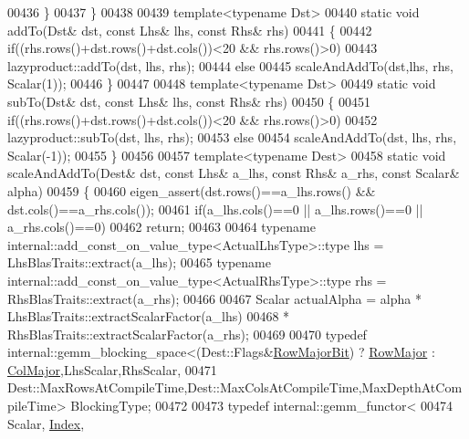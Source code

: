\begin{DoxyCode}
00436     \}
00437   \}
00438 
00439   \textcolor{keyword}{template}<\textcolor{keyword}{typename} Dst>
00440   \textcolor{keyword}{static} \textcolor{keywordtype}{void} addTo(Dst& dst, \textcolor{keyword}{const} Lhs& lhs, \textcolor{keyword}{const} Rhs& rhs)
00441   \{
00442     \textcolor{keywordflow}{if}((rhs.rows()+dst.rows()+dst.cols())<20 && rhs.rows()>0)
00443       lazyproduct::addTo(dst, lhs, rhs);
00444     \textcolor{keywordflow}{else}
00445       scaleAndAddTo(dst,lhs, rhs, Scalar(1));
00446   \}
00447 
00448   \textcolor{keyword}{template}<\textcolor{keyword}{typename} Dst>
00449   \textcolor{keyword}{static} \textcolor{keywordtype}{void} subTo(Dst& dst, \textcolor{keyword}{const} Lhs& lhs, \textcolor{keyword}{const} Rhs& rhs)
00450   \{
00451     \textcolor{keywordflow}{if}((rhs.rows()+dst.rows()+dst.cols())<20 && rhs.rows()>0)
00452       lazyproduct::subTo(dst, lhs, rhs);
00453     \textcolor{keywordflow}{else}
00454       scaleAndAddTo(dst, lhs, rhs, Scalar(-1));
00455   \}
00456 
00457   \textcolor{keyword}{template}<\textcolor{keyword}{typename} Dest>
00458   \textcolor{keyword}{static} \textcolor{keywordtype}{void} scaleAndAddTo(Dest& dst, \textcolor{keyword}{const} Lhs& a\_lhs, \textcolor{keyword}{const} Rhs& a\_rhs, \textcolor{keyword}{const} Scalar& alpha)
00459   \{
00460     eigen\_assert(dst.rows()==a\_lhs.rows() && dst.cols()==a\_rhs.cols());
00461     \textcolor{keywordflow}{if}(a\_lhs.cols()==0 || a\_lhs.rows()==0 || a\_rhs.cols()==0)
00462       \textcolor{keywordflow}{return};
00463 
00464     \textcolor{keyword}{typename} internal::add\_const\_on\_value\_type<ActualLhsType>::type lhs = LhsBlasTraits::extract(a\_lhs);
00465     \textcolor{keyword}{typename} internal::add\_const\_on\_value\_type<ActualRhsType>::type rhs = RhsBlasTraits::extract(a\_rhs);
00466 
00467     Scalar actualAlpha = alpha * LhsBlasTraits::extractScalarFactor(a\_lhs)
00468                                * RhsBlasTraits::extractScalarFactor(a\_rhs);
00469 
00470     \textcolor{keyword}{typedef} internal::gemm\_blocking\_space<(Dest::Flags&\hyperlink{group__flags_gae4f56c2a60bbe4bd2e44c5b19cbe8762}{RowMajorBit}) ? 
      \hyperlink{group__enums_ggaacded1a18ae58b0f554751f6cdf9eb13acfcde9cd8677c5f7caf6bd603666aae3}{RowMajor} : \hyperlink{group__enums_ggaacded1a18ae58b0f554751f6cdf9eb13a0cbd4bdd0abcfc0224c5fcb5e4f6669a}{ColMajor},LhsScalar,RhsScalar,
00471             Dest::MaxRowsAtCompileTime,Dest::MaxColsAtCompileTime,MaxDepthAtCompileTime> BlockingType;
00472 
00473     \textcolor{keyword}{typedef} internal::gemm\_functor<
00474       Scalar, \hyperlink{namespace_eigen_a62e77e0933482dafde8fe197d9a2cfde}{Index},

\end{DoxyCode}
